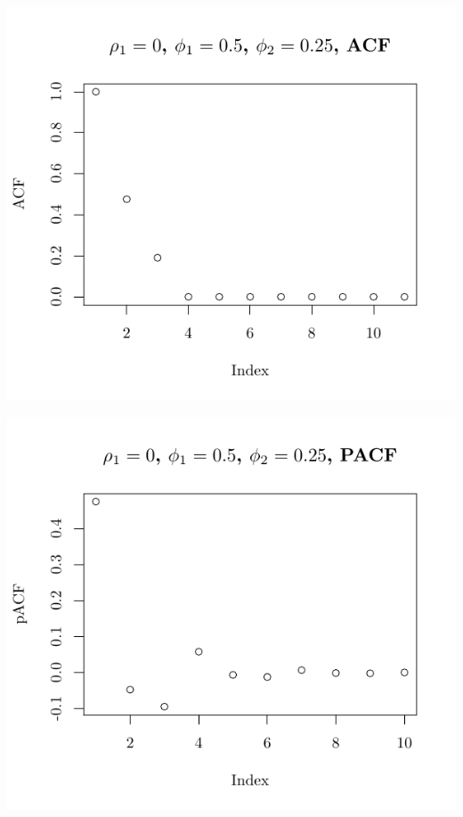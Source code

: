 \documentclass[10pt]{paper}\usepackage[]{graphicx}\usepackage[]{color}
\makeatletter
\def\maxwidth{ %
  \ifdim\Gin@nat@width>\linewidth
    \linewidth
  \else
    \Gin@nat@width
  \fi
}
\newenvironment{knitrout}{}{} %
\makeatother
\begin{document}
\begin{knitrout}
{\centering \includegraphics[width=\maxwidth]{figure/graphics-plotter-31} 

}




{\centering \includegraphics[width=\maxwidth]{figure/graphics-plotter-32} 

}





\end{knitrout}
\end{document}
